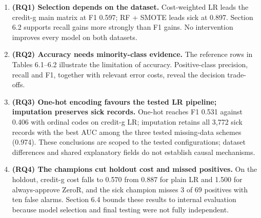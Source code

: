 \documentclass[12pt]{article}
\begin{document}
\begin{enumerate}
\item \textbf{(RQ1) Selection depends on the dataset.} Cost-weighted LR leads the
credit-g main matrix at F1 0.597; RF + SMOTE leads sick at 0.897. Section 6.2 supports
recall gains more strongly than F1 gains. No intervention improves every model on both
datasets.
\item \textbf{(RQ2) Accuracy needs minority-class evidence.} The reference rows in
Tables 6.1--6.2 illustrate the limitation of accuracy. Positive-class precision, recall
and F1, together with relevant error costs, reveal the decision trade-offs.
\item \textbf{(RQ3) One-hot encoding favours the tested LR pipeline; imputation
preserves sick records.} One-hot reaches F1 0.531 against 0.406 with ordinal codes on
credit-g LR; imputation retains all 3{,}772 sick records with the best AUC among the
three tested missing-data schemes (0.974). These conclusions are scoped to the tested
configurations; dataset differences and shared explanatory fields do not establish
causal mechanisms.
\item \textbf{(RQ4) The champions cut holdout cost and missed positives.} On the
holdout, credit-g cost falls to 0.570 from 0.887 for plain LR and 1.500 for
always-approve ZeroR, and the sick champion misses 3 of 69 positives with ten false
alarms. Section 6.4 bounds these results to internal evaluation because model
selection and final testing were not fully independent.
\end{enumerate}
\end{document}
